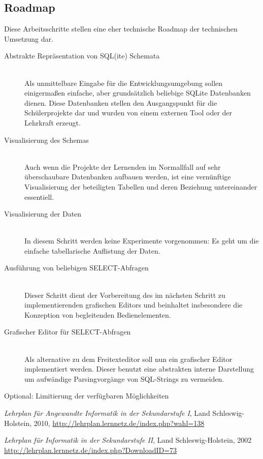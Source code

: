 \documentclass[paper=a4,fontsize=11pt,parskip=half]{scrartcl}
\begin{document}
\subsection{Roadmap}

Diese Arbeitsschritte stellen eine eher technische Roadmap der technischen Umsetzung dar.

\begin{description}
\item[Abstrakte Repräsentation von SQL(ite) Schemata] \hfill\\
  Als unmittelbare Eingabe für die Entwicklungsumgebung sollen einigermaßen einfache, aber grundsätzlich beliebige SQLite Datenbanken dienen. Diese Datenbanken stellen den Ausgangspunkt für die Schülerprojekte dar und wurden von einem externen Tool oder der Lehrkraft erzeugt.
\item[Visualisierung des Schemas] \hfill\\
  Auch wenn die Projekte der Lernenden im Normallfall auf sehr überschaubare Datenbanken aufbauen werden, ist eine vernünftige Visualisierung der beteiligten Tabellen und deren Beziehung untereinander essentiell.
\item[Visualisierung der Daten] \hfill\\
  In diesem Schritt werden keine Experimente vorgenommen: Es geht um die einfache tabellarische Auflistung der Daten.
\item[Ausführung von beliebigen SELECT-Abfragen] \hfill\\
  Dieser Schritt dient der Vorbereitung des im nächsten Schritt zu implementierenden grafischen Editors und beinhaltet insbesondere die Konzeption von begleitenden Bedienelementen.
\item[Grafischer Editor für SELECT-Abfragen] \hfill\\
  Als alternative zu dem Freitexteditor soll nun ein grafischer Editor implementiert werden. Dieser benutzt eine abstrakten interne Darstellung um aufwändige Parsingvorgänge von SQL-Strings zu vermeiden.
\item[Optional: Limitierung der verfügbaren Möglichkeiten] \hfill
  
\end{description}

\listoftodos[Notes]

\begin{thebibliography}{9}

  \emph{Lehrplan für Angewandte Informatik in der Sekundarstufe I}, Land Schleswig-Holstein, 2010, \url{http://lehrplan.lernnetz.de/index.php?wahl=138}

  \emph{Lehrplan für Informatik in der Sekundarstufe II}, Land Schleswig-Holstein, 2002 \\
  \url{http://lehrplan.lernnetz.de/index.php?DownloadID=73}

\end{thebibliography}
\end{document}
